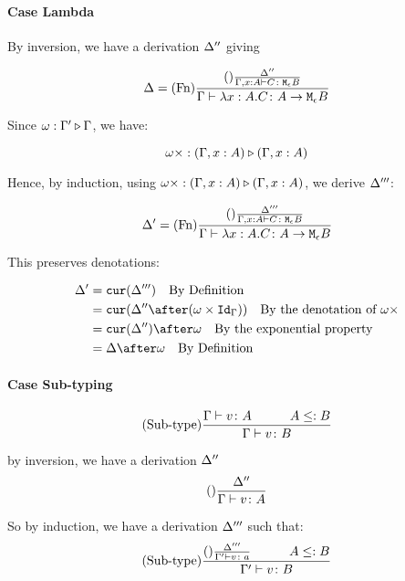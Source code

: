 \documentclass{report}
\begin{document}
\paragraph{Case Lambda}
By inversion, we have a derivation $\Delta''$ giving

\begin{equation}
    \Delta = (\text{Fn}) \frac{
        (\text{}) \frac{\Delta''}{\Gamma, x: A \vdash C \colon \texttt{M}_{\epsilon}{B}}
    }{\Gamma \vdash \lambda x : A. C \colon A \rightarrow \texttt{M}_{\epsilon}{B}}
\end{equation}

Since $\omega : \Gamma' \triangleright \Gamma$, we have:

\begin{equation}
    \omega\times : (\Gamma,x:  A) \triangleright (\Gamma, x: A)
\end{equation}

Hence, by induction, using $\omega\times : (\Gamma,x:  A) \triangleright (\Gamma, x: A)$, we derive $\Delta'''$:

\begin{equation}
    \Delta' = (\text{Fn}) \frac{
        (\text{}) \frac{\Delta'''}{\Gamma, x: A \vdash C \colon \texttt{M}_{\epsilon}{B}}
    }{\Gamma \vdash \lambda x : A. C \colon A \rightarrow \texttt{M}_{\epsilon}{B}}
\end{equation}

This preserves denotations:


\begin{align}
\D' & = \cur{\D'''} \qt{By Definition}\\
& = \cur{\D''\after(\w\times \idg)}\qt{By the denotation of $\w\x$} \\
&= \cur{\D''}\after\w\qt{By the exponential property}\\
&= \D\after \w \qt{By Definition}
\end{align}


\paragraph{Case Sub-typing}

\begin{equation}
    \treerule{Sub-type}{\gtyperelation{v}{A}\s\s A\subtype B}{\gtyperelation{v}{B}}
\end{equation}

by inversion, we have a derivation $\Delta''$
\begin{equation}
    (\text{}) \frac{\Delta''}{\Gamma \vdash v \colon A}
\end{equation}

So by induction, we have a derivation $\Delta'''$ such that:
\begin{equation}
    \treerule{Sub-type}{\treerule{}{\D'''}{\typerelation{\G'}{v}{a}}\s\s A \subtype B}{\typerelation{\G'}{v}{B}}
\end{equation}
\end{document}
